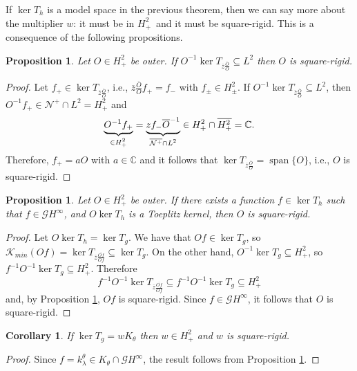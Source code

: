 \documentclass[12pt]{elsarticle}
\numberwithin{equation}{section}
\theoremstyle{plain}
\newtheorem{prop}[thm]{Proposition}
\newtheorem{cor}[thm]{Corollary}
\newcommand{\Hp}{\ensuremath{H^2_+}}
\newcommand{\Hpm}{\ensuremath{H^2_\pm}}
\newcommand{\Hinf}{\ensuremath{H^\infty}}
\newcommand{\CC}{\ensuremath{\mathbb{C}}}
\newcommand{\GG}{\ensuremath{\mathcal{G}}}
\newcommand{\KKmin}{\ensuremath{\mathcal{K}_{min}}}
\newcommand{\NN}{\ensuremath{\mathcal{N}^+}}
\newcommand{\ol}[1]{\ensuremath{\overline{#1}}}
\newcommand{\annot}[2]{\underbrace{#1}_{\smash[b]{\scriptstyle #2}}}
\newcommand{\spn}{\ensuremath{\operatorname{span}}}
\newcommand{\kk}{\ensuremath{k^\theta_\lambda}}
\renewcommand{\subset}{\subseteq}
\begin{document}
If $\ker T_h$ is a model space in the previous theorem, then we can say more about the multiplier $w$: it must be in \Hp\ and it must be square-rigid.
This is a consequence of the following propositions.


\begin{prop}
\label{prop:multipliers.are.square-rigid}
Let $O\in\Hp$ be outer.
If $O^{-1} \ker T_{\ol z \frac{\ol O}{O}} \subset L^2$ then $O$ is square-rigid.
\end{prop}

\begin{proof}
Let $f_+\in \ker T_{\ol z \frac{\ol O}{O}}$, i.e., $\ol z \frac{\ol O}{O} f_+ = f_-$ with $f_\pm \in \Hpm$.
If $O^{-1} \ker T_{\ol z \frac{\ol O}{O}} \subset L^2$, then $O^{-1} f_+ \in \NN \cap L^2 = \Hp$ and
\[
\annot{O^{-1} f_+}{\in \Hp}
 = \annot{z f_-\ol O^{-1}}{\ol\NN \cap L^2}
   \in \Hp \cap \ol\Hp = \CC.
\]
Therefore, $f_+ = a O$ with $a\in\CC$ and it follows that $\ker T_{\ol z \frac{\ol O}{O}} = \spn \{ O \}$, i.e., $O$ is square-rigid.
\end{proof}



\begin{prop}
\label{prop:multipliers.are.square-rigid.2}
Let $O\in\Hp$ be outer.
If there exists a function $f\in\ker T_h$ such that $f\in\GG\Hinf$, and $O \ker T_h$ is a Toeplitz kernel, then $O$ is square-rigid.
\end{prop}

\begin{proof}
Let $O \ker T_h = \ker T_g$.
We have that $Of\in\ker T_g$, so $\KKmin(Of) = \ker T_{\ol z \frac{\ol{Of}}{Of}} \subset \ker T_g$.
On the other hand, $O^{-1} \ker T_g \subset \Hp$, so $f^{-1} O^{-1} \ker T_g \subset \Hp$.
Therefore
\[
f^{-1} O^{-1} \ker T_{\ol z \frac{\ol{Of}}{Of}} \subset f^{-1} O^{-1} \ker T_g \subset \Hp
\]
and, by Proposition \ref{prop:multipliers.are.square-rigid}, $Of$ is square-rigid.
Since $f\in\GG\Hinf$, it follows that $O$ is square-rigid.
\end{proof}


\begin{cor}
\label{cor:mult.from.model.space.onto.kernel.are.square-rigid}
If $\ker T_g = w K_\theta$ then $w\in\Hp$ and $w$ is square-rigid.
\end{cor}


\begin{proof}
Since $f=\kk \in K_\theta \cap \GG\Hinf$, the result follows from Proposition \ref{prop:multipliers.are.square-rigid.2}.
\end{proof}
\end{document}
